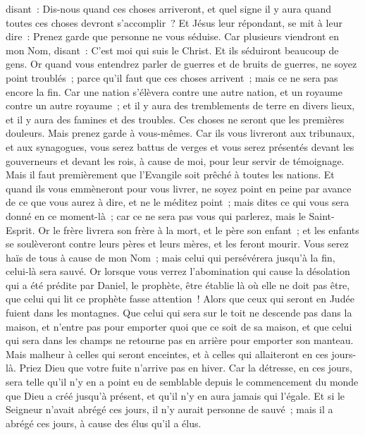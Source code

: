 \begin{multicols}{2}
disant~: Dis-nous quand ces choses arriveront, et quel signe il y aura quand toutes ces choses devront s'accomplir~?
Et Jésus leur répondant, se mit à leur dire~: Prenez garde que personne ne vous séduise.
Car plusieurs viendront en mon Nom, disant~: C'est moi qui suis le Christ. Et ils séduiront beaucoup de gens.
Or quand vous entendrez parler de guerres et de bruits de guerres, ne soyez point troublés~; parce qu'il faut que ces choses arrivent~; mais ce ne sera pas encore la fin.
Car une nation s'élèvera contre une autre nation, et un royaume contre un autre royaume~; et il y aura des tremblements de terre en divers lieux, et il y aura des famines et des troubles. Ces choses ne seront que les premières douleurs.
Mais prenez garde à vous-mêmes. Car ils vous livreront aux tribunaux, et aux synagogues, vous serez battus de verges et vous serez présentés devant les gouverneurs et devant les rois, à cause de moi, pour leur servir de témoignage.
Mais il faut premièrement que l'Evangile soit prêché à toutes les nations.
Et quand ils vous emmèneront pour vous livrer, ne soyez point en peine par avance de ce que vous aurez à dire, et ne le méditez point~; mais dites ce qui vous sera donné en ce moment-là~; car ce ne sera pas vous qui parlerez, mais le Saint-Esprit.
Or le frère livrera son frère à la mort, et le père son enfant~; et les enfants se soulèveront contre leurs pères et leurs mères, et les feront mourir.
Vous serez haïs de tous à cause de mon Nom~; mais celui qui persévérera jusqu'à la fin, celui-là sera sauvé.
Or lorsque vous verrez l'abomination qui cause la désolation qui a été prédite par Daniel, le prophète, être établie là où elle ne doit pas être, que celui qui lit ce prophète fasse attention~! Alors que ceux qui seront en Judée fuient dans les montagnes.
Que celui qui sera sur le toit ne descende pas dans la maison, et n'entre pas pour emporter quoi que ce soit de sa maison,
et que celui qui sera dans les champs ne retourne pas en arrière pour emporter son manteau.
Mais malheur à celles qui seront enceintes, et à celles qui allaiteront en ces jours-là.
Priez Dieu que votre fuite n'arrive pas en hiver.
Car la détresse, en ces jours, sera telle qu'il n'y en a point eu de semblable depuis le commencement du monde que Dieu a créé jusqu'à présent, et qu'il n'y en aura jamais qui l'égale.
Et si le Seigneur n'avait abrégé ces jours, il n'y aurait personne de sauvé~; mais il a abrégé ces jours, à cause des élus qu'il a élus.

\end{multicols}
